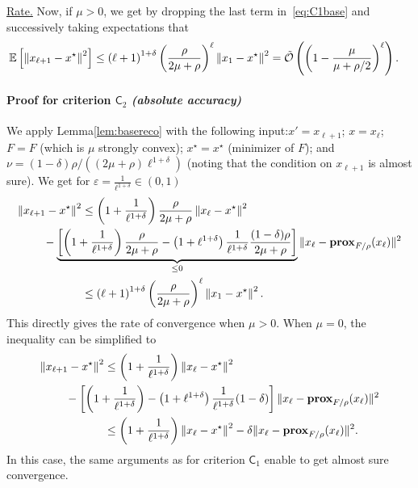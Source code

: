      \vspace*{1ex}
     \noindent\underline{Rate.} Now, if $\mu>0$, we get by dropping the last term in~\eqref{eq:C1base} and successively taking expectations that  
      \begin{align}
        \mathbb{E} \left[   \left\|x_{\ell+1} - x^\star  \right\|^2 \right] &\leq \left( {\ell} + 1  \right)^{1+\delta}  \left( \frac{{\rho }}{2\mu + {\rho }} \right)^\ell  \left\| x_1 - x^\star \right\|^2 
        = \tilde{\mathcal{O}} \left( \left( 1 - \frac{{\mu }}{\mu + {\rho }/2} \right)^\ell \right).
     \end{align}


\vspace*{1ex}
\paragraph{Proof for criterion $\mathsf{C}_2$ \emph{(absolute accuracy)}}

We apply Lemma\;\ref{lem:basereco} with the following input:\;$x'\!= x_{\ell+1}$; $x = x_\ell$; $F = F$ (which is $\mu$ strongly convex); $x^\star =x^\star$ (minimizer of $F$); 
and $ \nu = (1-\delta)\rho/((2\mu+\rho)\ell^{1+\delta})$ (noting that the condition on $x_{\ell+1}$ is almost sure). We get for $\varepsilon = \frac{1}{\ell^{1+\delta}} \in (0,1)$
        \begin{align*}
  \left\|x_{\ell+1} - x^\star  \right\|^2 &\leq \left( 1 + \frac{1}{\ell^{1+\delta}} \right)  \frac{{\rho }}{2\mu + {\rho }}  \left\| x_\ell - x^\star \right\|^2 \\
   \nonumber     &\hspace*{-1.2cm} - \underbrace{\left[ \left(1 + \frac{1}{\ell^{1+\delta}}\right) \frac{{\rho }}{2\mu + {\rho }}  - \left( 1 + \ell^{1+\delta} \right)  \frac{1}{\ell^{1+\delta}}  \frac{{(1-\delta)\rho }}{2\mu + {\rho }} \right]}_{\leq 0}  \|x_\ell -  \prox_{F/{\rho }}(x_\ell)   \|^2 \\
 \nonumber  &\leq  \left( {\ell} + 1  \right)^{1+\delta}  \left( \frac{{\rho }}{2\mu + {\rho }} \right)^\ell  \left\| x_1 - x^\star \right\|^2 .
     \end{align*}
     This directly gives the rate of convergence when $\mu>0$. 
    When $\mu=0$, the inequality can be simplified to
    \begin{align}
  \nonumber \left\|x_{\ell+1} - x^\star  \right\|^2 &\leq \left( 1 + \frac{1}{\ell^{1+\delta}} \right)    \left\| x_\ell - x^\star \right\|^2 \\
   \nonumber     &\hspace*{-1.2cm} -  \left[ \left(1 + \frac{1}{\ell^{1+\delta}}\right)   - \left( 1 + \ell^{1+\delta} \right)  \frac{1}{\ell^{1+\delta}}  (1-\delta) \right]  \|x_\ell -  \prox_{F/{\rho }}(x_\ell)   \|^2 \\
\nonumber  &\leq \left( 1 + \frac{1}{\ell^{1+\delta}} \right)    \left\| x_\ell - x^\star \right\|^2 - \delta  \|x_\ell -  \prox_{F/{\rho }}(x_\ell)   \|^2.
     \end{align}
     In this case, the same arguments as for criterion $\mathsf{C}_1$ enable to get almost sure convergence.


